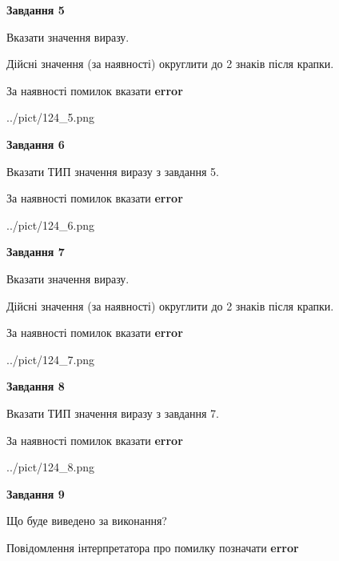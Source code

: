 \documentclass[11pt, ukrainian]{article}
\begin{document}
{\begin {large}
{\begin {center}\textbf{Завдання 5}\end {center}}\par
Вказати значення виразу. \par
Дійсні значення (за наявності) округлити до 2 знаків після крапки. \par
За наявності помилок вказати \textbf{error}

\begin{center}
	{../pict/124_5.png}
\end{center}
\newpage

{\begin {center}\textbf{Завдання 6}\end {center}}\par
Вказати ТИП значення виразу з завдання 5. \par
За наявності помилок вказати \textbf{error}

\begin{center}
	{../pict/124_6.png}
\end{center}
\newpage

{\begin {center}\textbf{Завдання 7}\end {center}}\par
Вказати значення виразу. \par
Дійсні значення (за наявності) округлити до 2 знаків після крапки. \par
За наявності помилок вказати \textbf{error}

\begin{center}
	{../pict/124_7.png}
\end{center}
\newpage

{\begin {center}\textbf{Завдання 8}\end {center}}\par
Вказати ТИП значення виразу з завдання 7. \par
За наявності помилок вказати \textbf{error}

\begin{center}
	{../pict/124_8.png}
\end{center}
\newpage

{\begin {center}\textbf{Завдання 9}\end {center}}\par
Що буде виведено за виконання? \par
Повідомлення інтерпретатора про помилку позначати \textbf{error}


\end{large}}
\end{document}
